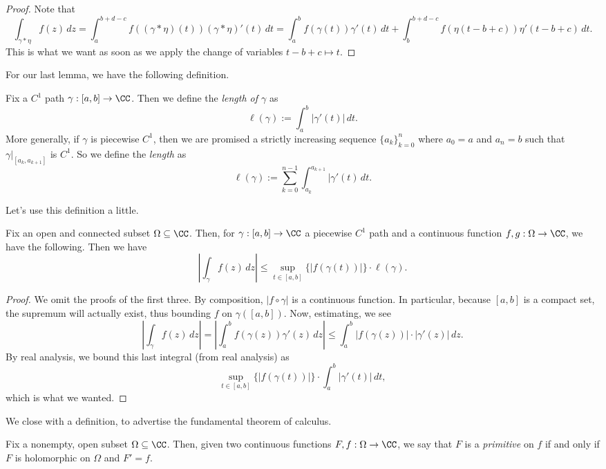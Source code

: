 \begin{proof}
	Note that
	\[\int_{\gamma*\eta}f(z)\,dz=\int_a^{b+d-c}f((\gamma*\eta)(t))(\gamma*\eta)'(t)\,dt=\int_a^bf(\gamma(t))\gamma'(t)\,dt+\int_{b}^{b+d-c}f(\eta(t-b+c))\eta'(t-b+c)\,dt.\]
	This is what we want as soon as we apply the change of variables $t-b+c\mapsto t$.
\end{proof}
For our last lemma, we have the following definition.
\begin{definition}[Length]
	Fix a $C^1$ path $\gamma:[a,b]\to\CC$. Then we define the \textit{length of $\gamma$} as
	\[\ell(\gamma):=\int_a^b|\gamma'(t)|\,dt.\]
	More generally, if $\gamma$ is piecewise $C^1$, then we are promised a strictly increasing sequence $\{a_k\}_{k=0}^n$ where $a_0=a$ and $a_n=b$ such that $\gamma|_{[a_k,a_{k+1}]}$ is $C^1$. So we define the \textit{length} as
	\[\ell(\gamma):=\sum_{k=0}^{n-1}\int_{a_k}^{a_{k+1}}|\gamma'(t)\,dt.\]
\end{definition}
Let's use this definition a little.
\begin{proposition}
	Fix an open and connected subset $\Omega\subseteq\CC$. Then, for $\gamma:[a,b]\to\CC$ a piecewise $C^1$ path and a continuous function $f,g:\Omega\to\CC$, we have the following. Then we have
	\[\left|\int_\gamma f(z)\,dz\right|\le\sup_{t\in[a,b]}\{|f(\gamma(t))|\}\cdot\ell(\gamma).\]
\end{proposition}
\begin{proof}
	We omit the proofs of the first three. By composition, $|f\circ\gamma|$ is a continuous function. In particular, because $[a,b]$ is a compact set, the supremum will actually exist, thus bounding $f$ on $\gamma([a,b])$.  Now, estimating, we see
	\[\left|\int_\gamma f(z)\,dz\right|=\left|\int_a^bf(\gamma(z))\gamma'(z)\,dz\right|\le\int_a^b|f(\gamma(z))|\cdot|\gamma'(z)|\,dz.\]
	By real analysis, we bound this last integral (from real analysis) as
	\[\sup_{t\in[a,b]}\{|f(\gamma(t))|\}\cdot\int_a^b|\gamma'(t)|\,dt,\]
	which is what we wanted.
\end{proof}
We close with a definition, to advertise the fundamental theorem of calculus.
\begin{definition}[Primitive]
	Fix a nonempty, open subset $\Omega\subseteq\CC$. Then, given two continuous functions $F,f:\Omega\to\CC$, we say that $F$ is a \textit{primitive} on $f$ if and only if $F$ is holomorphic on $\Omega$ and $F'=f$.
\end{definition}